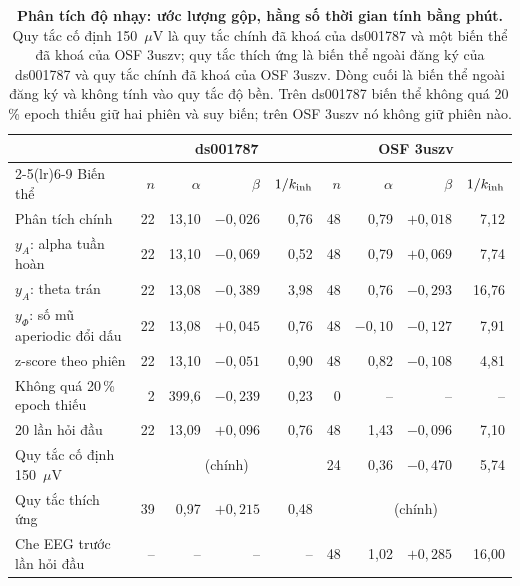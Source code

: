 \begin{table}[t]
\caption{\textbf{Phân tích độ nhạy: ước lượng gộp, hằng số thời gian tính bằng phút.} Quy tắc cố định 150~$\mu$V là quy tắc chính đã khoá của ds001787 và một biến thể đã khoá của OSF 3uszv; quy tắc thích ứng là biến thể ngoài đăng ký của ds001787 và quy tắc chính đã khoá của OSF 3uszv. Dòng cuối là biến thể ngoài đăng ký và không tính vào quy tắc độ bền. Trên ds001787 biến thể không quá 20\,\% epoch thiếu giữ hai phiên và suy biến; trên OSF 3uszv nó không giữ phiên nào.}
\label{tab:sens}
\centering\footnotesize
\setlength{\tabcolsep}{5pt}
\begin{tabular}{lrrrrrrrr}
\toprule
 & \multicolumn{4}{c}{ds001787} & \multicolumn{4}{c}{OSF 3uszv} \\
\cmidrule(lr){2-5}\cmidrule(lr){6-9}
Biến thể & $n$ & $\alpha$ & $\beta$ & $1/k_{\mathrm{inh}}$ & $n$ & $\alpha$ & $\beta$ & $1/k_{\mathrm{inh}}$ \\
\midrule
Phân tích chính                      & 22 & 13,10 & $-0{,}026$ & 0,76 & 48 & 0,79 & $+0{,}018$ & 7,12 \\
$y_A$: alpha tuần hoàn               & 22 & 13,10 & $-0{,}069$ & 0,52 & 48 & 0,79 & $+0{,}069$ & 7,74 \\
$y_A$: theta trán                    & 22 & 13,08 & $-0{,}389$ & 3,98 & 48 & 0,76 & $-0{,}293$ & 16,76 \\
$y_\Phi$: số mũ aperiodic đổi dấu    & 22 & 13,08 & $+0{,}045$ & 0,76 & 48 & $-0{,}10$ & $-0{,}127$ & 7,91 \\
z-score theo phiên                   & 22 & 13,10 & $-0{,}051$ & 0,90 & 48 & 0,82 & $-0{,}108$ & 4,81 \\
Không quá 20\,\% epoch thiếu         &  2 & 399,6 & $-0{,}239$ & 0,23 &  0 & -- & -- & -- \\
20 lần hỏi đầu                       & 22 & 13,09 & $+0{,}096$ & 0,76 & 48 & 1,43 & $-0{,}096$ & 7,10 \\
Quy tắc cố định 150~$\mu$V           & \multicolumn{4}{c}{(chính)} & 24 & 0,36 & $-0{,}470$ & 5,74 \\
Quy tắc thích ứng                    & 39 & 0,97 & $+0{,}215$ & 0,48 & \multicolumn{4}{c}{(chính)} \\
Che EEG trước lần hỏi đầu            & -- & -- & -- & -- & 48 & 1,02 & $+0{,}285$ & 16,00 \\
\bottomrule
\end{tabular}
\end{table}

